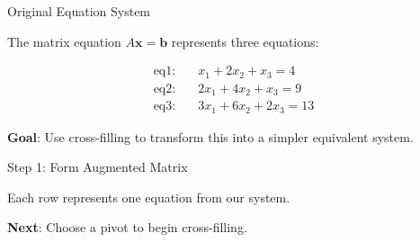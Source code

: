 \documentclass[10pt]{beamer}
\theoremstyle{definition}
\newcommand{\x}[1]{\alert{\textbf{#1}}}
\begin{document}
\begin{frame}{Original Equation System}

The matrix equation $A\mathbf{x} = \mathbf{b}$ represents three equations:

\vspace{0.5em}

\begin{align*}
\text{eq1}: \quad &x_1 + 2x_2 + x_3 = 4 \\
\text{eq2}: \quad &2x_1 + 4x_2 + x_3 = 9 \\
\text{eq3}: \quad &3x_1 + 6x_2 + 2x_3 = 13
\end{align*}

\vspace{1em}

\x{Goal}: Use cross-filling to transform this into a simpler equivalent system.

\end{frame}

\begin{frame}[fragile]{Step 1: Form Augmented Matrix}

\begin{center}
\end{center}

\vspace{1em}

Each row represents one equation from our system.

\vspace{1em}

\x{Next}: Choose a pivot to begin cross-filling.

\end{frame}
\end{document}
